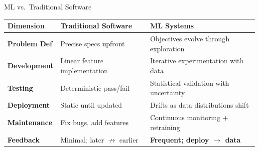 \documentclass[aspectratio=169, 12pt]{beamer}
\begin{document}
\begin{frame}{ML vs.\ Traditional Software}
\note{
%
%
%
%
}

\scriptsize
\renewcommand{\arraystretch}{1.1}
\begin{tabular}{@{}lp{3.5cm}p{5cm}@{}}
  \toprule
  \textbf{Dimension} & \textbf{Traditional Software} & \textbf{ML Systems} \\
  \midrule
  \textbf{Problem Def}  & Precise specs upfront         & Objectives evolve through exploration \\
  \textbf{Development}   & Linear feature implementation & Iterative experimentation with data \\
  \textbf{Testing}       & Deterministic pass/fail       & Statistical validation with uncertainty \\
  \textbf{Deployment}    & Static until updated          & Drifts as data distributions shift \\
  \textbf{Maintenance}   & Fix bugs, add features        & Continuous monitoring + retraining \\
  \textbf{Feedback}      & Minimal; later $\not\to$ earlier & \textcolor{errorstroke}{\textbf{Frequent; deploy $\to$ data}} \\
  \bottomrule
\end{tabular}

\vspace{0.1cm}
\small
{}

\end{frame}
\end{document}

